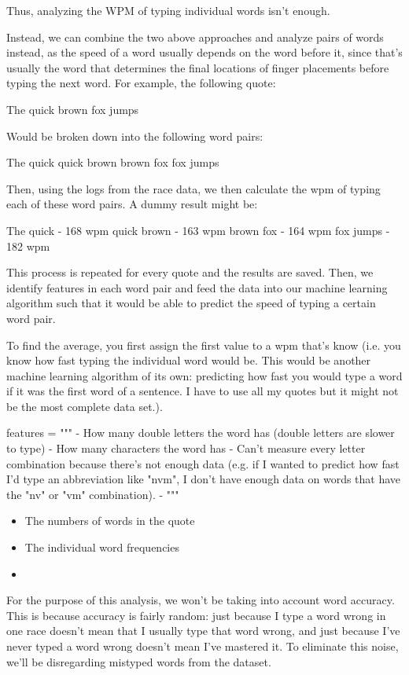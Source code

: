 \documentclass[12pt]{article}
\begin{document}
Thus, analyzing the WPM of typing individual words isn't enough.

Instead, we can combine the two above approaches and analyze pairs of words instead, as the speed of a word usually depends on the word before it, since that's usually the word that determines the final locations of finger placements before typing the next word. For example, the following quote:

The quick brown fox jumps

Would be broken down into the following word pairs:

The quick
quick brown
brown fox
fox jumps

Then, using the logs from the race data, we then calculate the wpm of typing each of these word pairs. A dummy result might be:

The quick - 168 wpm
quick brown - 163 wpm
brown fox - 164 wpm
fox jumps - 182 wpm

This process is repeated for every quote and the results are saved. Then, we identify features in each word pair and feed the data into our machine learning algorithm such that it would be able to predict the speed of typing a certain word pair.

To find the average, you first assign the first value to a wpm that's know (i.e. you know how fast typing the individual word would be. This would be another machine learning algorithm of its own: predicting how fast you would type a word if it was the first word of a sentence. I have to use all my quotes but it might not be the most complete data set.).

\begin{pycode}
features = """
	- How many double letters the word has (double letters are slower to type)
	- How many characters the word has
	- Can't measure every letter combination because there's not enough data (e.g. if I wanted to predict how fast I'd type an abbreviation like "nvm", I don't have enough data on words that have the "nv" or "vm" combination).
	-
"""
\end{pycode}

\begin{itemize}
	\item The numbers of words in the quote
	\item The individual word frequencies
	\item
\end{itemize}

For the purpose of this analysis, we won't be taking into account word accuracy. This is because accuracy is fairly random: just because I type a word wrong in one race doesn't mean that I usually type that word wrong, and just because I've never typed a word wrong doesn't mean I've mastered it. To eliminate this noise, we'll be disregarding mistyped words from the dataset.
\end{document}
